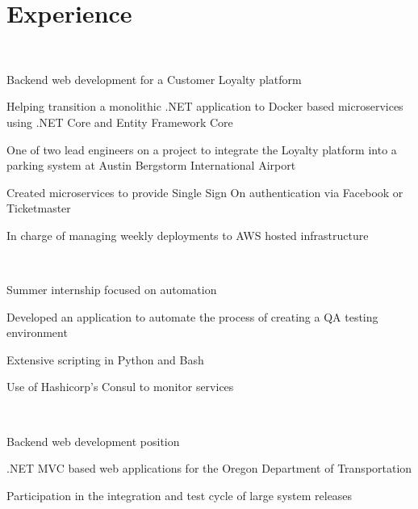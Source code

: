 \documentclass[]{hieudo-build}
\begin{document}
\hfill
\begin{minipage}[t]{0.69\textwidth} 

\section{Experience}

\\
\vspace{0.9em} %
\begin{tightemize}
\item Backend web development for a Customer Loyalty platform
\item Helping transition a monolithic .NET application to Docker based microservices using .NET Core and Entity Framework Core
\item One of two lead engineers on a project to integrate the Loyalty platform into a parking system at Austin Bergstorm International Airport
\item Created microservices to provide Single Sign On authentication via Facebook or Ticketmaster
\item In charge of managing weekly deployments to AWS hosted infrastructure
\end{tightemize}

\sectionsep

 \\
\begin{tightemize}
\item Summer internship focused on automation
\item Developed an application to automate the process of creating a QA testing environment
\item Extensive scripting in Python and Bash
\item Use of Hashicorp’s Consul to monitor services
\end{tightemize}

\sectionsep

 \\
\begin{tightemize}
\item Backend web development position
\item .NET MVC based web applications for the Oregon Department of Transportation
\item Participation in the integration
and test cycle of large system releases
\end{tightemize}
\sectionsep



\end{minipage}
\end{document}
